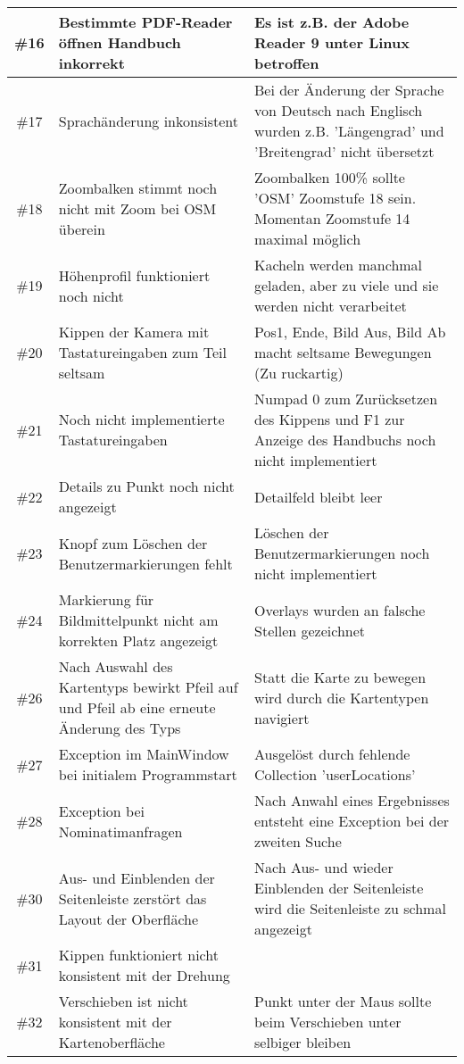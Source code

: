 \documentclass[10pt]{scrreprt}
\begin{document}
\begin{longtable}{|c|p{5.2cm}|p{8.2cm}|}
\hline
\#16 & Bestimmte PDF-Reader öffnen Handbuch inkorrekt & Es ist z.B. der Adobe Reader 9 unter Linux betroffen \\
\hline
\#17 & Sprachänderung inkonsistent & Bei der Änderung der Sprache von Deutsch nach Englisch wurden z.B. 'Längengrad' und 'Breitengrad' nicht übersetzt\\
\hline
\#18 & Zoombalken stimmt noch nicht mit Zoom bei OSM überein & Zoombalken 100\% sollte 'OSM' Zoomstufe 18 sein. Momentan Zoomstufe 14 maximal möglich\\
\hline
\#19 & Höhenprofil funktioniert noch nicht & Kacheln werden manchmal geladen, aber zu viele und sie werden nicht verarbeitet \\
\hline
\#20 & Kippen der Kamera mit Tastatureingaben zum Teil seltsam & Pos1, Ende, Bild Aus, Bild Ab macht seltsame Bewegungen (Zu ruckartig) \\
\hline
\#21 & Noch nicht implementierte Tastatureingaben & Numpad 0 zum Zurücksetzen des Kippens und F1 zur Anzeige des Handbuchs noch nicht implementiert \\
\hline
\#22 & Details zu Punkt noch nicht angezeigt & Detailfeld bleibt leer \\
\hline
\#23 & Knopf zum Löschen der Benutzermarkierungen fehlt & Löschen der Benutzermarkierungen noch nicht implementiert \\
\hline
\#24 & Markierung für Bildmittelpunkt nicht am korrekten Platz angezeigt & Overlays wurden an falsche Stellen gezeichnet \\
\hline
\#26 & Nach Auswahl des Kartentyps bewirkt Pfeil auf und Pfeil ab eine erneute Änderung des Typs & Statt die Karte zu bewegen wird durch die Kartentypen navigiert \\
\hline
\#27 & Exception im MainWindow bei initialem Programmstart & Ausgelöst durch fehlende Collection 'userLocations' \\
\hline
\#28 & Exception bei Nominatimanfragen & Nach Anwahl eines Ergebnisses entsteht eine Exception bei der zweiten Suche \\
\hline
\#30 & Aus- und Einblenden der Seitenleiste zerstört das Layout der Oberfläche & Nach Aus- und wieder Einblenden der Seitenleiste wird die Seitenleiste zu schmal angezeigt \\
\hline
\#31 & Kippen funktioniert nicht konsistent mit der Drehung & \\
\hline
\#32 & Verschieben ist nicht konsistent mit der Kartenoberfläche & Punkt unter der Maus sollte beim Verschieben unter selbiger bleiben \\

\end{longtable}
\end{document}
